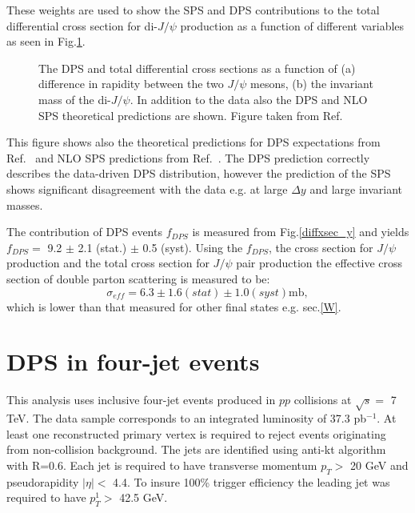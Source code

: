 \documentclass{ws-rv9x6}
\begin{document}
These weights are used to show the SPS and DPS contributions to the total differential cross section for di-$J/\psi$ production as a function of different variables as seen in Fig.\ref{diffxsec}.
\begin{figure}[ht]
\centerline{
  \hspace*{4pt}
}
\caption{The DPS and total differential cross sections as a function of (a) difference in rapidity between the two $J/\psi$ mesons, 
(b) the invariant mass of the di-$J/\psi$. 
In addition to the data also the DPS \cite{di43} and NLO SPS \cite{di1011} theoretical predictions are shown. Figure taken from Ref.~} \label{diffxsec} %
\end{figure}
This figure shows also  the theoretical predictions for DPS expectations from Ref.~ and NLO SPS predictions from Ref.~. The DPS prediction correctly describes the data-driven DPS distribution, however the prediction of the SPS shows significant disagreement with the data e.g. at large $\Delta y$ and  large invariant masses.

The contribution of DPS events $f_{D\!P\!S}$ is measured from Fig.\ref{diffxsec_y} and yields
$f_{D\!P\!S} =$ 9.2 $\pm$ 2.1 (stat.) $\pm$ 0.5 (syst).
 Using the $f_{D\!P\!S}$, the cross section for $J/\psi$ production and the total cross section for $J/\psi$ pair production the  effective cross section of double parton scattering is  measured to be: 
\begin{equation}
\sigma_{e\!f\!f} = 6.3 \pm 1.6 (stat) \pm 1.0 (syst) \textrm{mb},
\end{equation} 
which is lower than that measured for other final states e.g. sec.\ref{W}. 

\section{DPS in four-jet events}
This analysis uses  inclusive four-jet events produced in $pp$ collisions at $\sqrt{s}=$ 7 TeV. The data sample corresponds to an integrated luminosity of 37.3 pb$^{-1}$. At least one reconstructed primary vertex is required to reject events originating from non-collision background. The jets are identified using anti-kt algorithm with R=0.6. Each jet is required to have transverse momentum $p_T > $ 20 GeV and pseudorapidity $|\eta| < $ 4.4. To insure 100\% trigger efficiency the leading jet was required to have $p_T^1 > $ 42.5 GeV.
\end{document}
